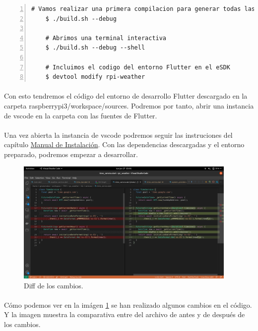 \begin{lstlisting}[style=consola, numbers=left]
    # Vamos realizar una primera compilacion para generar todas las tools del SDK
    $ ./build.sh --debug

    # Abrimos una terminal interactiva
    $ ./build.sh --debug --shell

    # Incluimos el codigo del entorno Flutter en el eSDK
    $ devtool modify rpi-weather
\end{lstlisting}

\paragraph{}Con esto tendremos el código del entorno de desarrollo Flutter descargado
en la carpeta raspberrypi3/workspace/sources. Podremos por tanto, abrir una instancia
de \Gls{vscode} en la carpeta con las fuentes de Flutter.

\paragraph{}Una vez abierta la instancia de \Gls{vscode} podremos seguir las instruciones
del capítulo \href{sec:ManualDeInstalacion}{Manual de Instalación}. Con las dependencias
descargadas y el entorno preparado, podremos empezar a desarrollar.

\begin{figure}[H]
    \centering
    \includegraphics[width=0.95\textwidth]{imgs/dev1}
    \caption[Diff de los cambios.]{Diff de los cambios.}
    \label{imgs:diff-code}
\end{figure}

\paragraph{}Cómo podemos ver en la imágen \ref{imgs:diff-code} se han realizado algunos
cambios en el código. Y la imagen muestra la comparativa entre del archivo de antes y de después
de los cambios.

